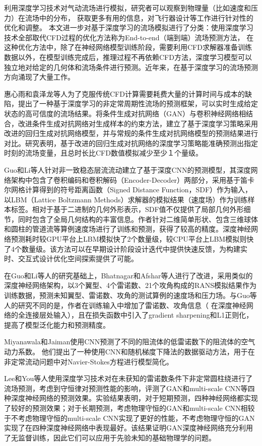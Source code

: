 利用深度学习技术对气动流场进行模拟，研究者可以观察到物理量（比如速度和压力）在流场中的分布，
获取更多有用的信息，对飞行器设计等工作进行针对性的优化和调整。
本文进一步对基于深度学习的流场模拟进行了分类：使用深度学习技术全部取代CFD过程的优化方法称为End-to-end（端到端）流场预测方法，
在这种优化方法中，除了在神经网络模型训练阶段，需要利用CFD求解器准备训练数据以外，在模型训练完成后，推理过程不再依赖CFD方法，深度学习模型可以独立地对给定的几何体和流场条件进行预测。近年来，在基于深度学习的流场预测方向涌现了大量工作。

惠心雨和袁泽龙等人\cite{惠心雨2019}为了克服传统CFD计算需要耗费大量的计算时间与成本的缺陷，提出了一种基于深度学习的非定常周期性流场的预测框架，可以实时生成给定状态的高可信度的流场结果。将条件生成对抗网络（GAN）与卷积神经网络相结合，改进条件生成对抗网络对生成样本的约束方法，建立了基于深度学习策略采用改进的回归生成对抗网络模型，并与常规的条件生成对抗网络模型的预测结果进行对比。研究表明，基于改进的回归生成对抗网络的深度学习策略能准确预测出指定时刻的流场变量，且总时长比CFD数值模拟减少至少１个量级。

Guo和Li等人\cite{DBLP:conf/kdd/GuoLI16}针对非一致稳态层流流动建立了基于深度CNN的预测模型，其深度网络架构中包含了卷积编码和卷积解码（Encoder-Decoder）两部分，采用基于笛卡尔网格计算得到的符号距离函数（Signed Distance Function，SDF）作为输入，以LBM（Lattice Boltzmann Methods）求解器的模拟结果（速度场）作为训练样本标签。相对于基于二进制的几何外形表示，SDF值不仅提供了局部几何外形细节，同时包含了全局几何结构的丰富信息。作者针对二维简单形状、包含三维球体和圆柱的管道流等算例速度场进行了训练和预测，获得了较高的精度。深度神经网络预测耗时较GPU平台上LBM模拟快了2个数量级，较CPU平台上LBM模拟则快了4个数量级。该方法可以在早期设计阶段设计迭代中提供快速反馈，为构建实时、交互式设计优化空间探索提供了可能。

在Guo和Li等人的研究基础上，Bhatnagar和Afshar等人\cite{bhatnagar2019prediction}进行了改进，采用类似的深度神经网络架构，以3个翼型、4个雷诺数、21个攻角构成的RANS模拟结果作为训练数据，预测未知翼型、雷诺数、攻角的测试算例的速度场和压力场。与Guo等人的研究不同的是，作者在训练输入中增加了雷诺数、攻角信息（ 在深度神经网络的全连接层处输入），且在损失函数中引入了gradient sharpening和L1正则化，提高了模型泛化能力和预测精度。

Miyanawala和Jaiman\cite{2017An}使用CNN预测了不同的阻流体的低雷诺数下的阻流体的空气动力系数。 他们提出了一种使用CNN和随机梯度下降法的数据驱动方法，用于在非定常流动问题中对Navier-Stokes方程进行模型简化。

Lee和You等人\cite{lee2019data}使用深度学习技术对在未获知的雷诺数条件下非定常圆柱绕进行了流场预测，考虑到守恒律对预测性能的影响，评测了GAN和multi-scale CNN等四种深度神经网络的预测效果。实验结果表明，对于短期预测，四种神经网络都实现了较好的预测效果；对于长期预测，考虑物理守恒的GAN和multi-scale CNN相较于不考虑物理守恒的multi-scale CNN实现了更好的性能，不考虑物理守恒的GAN实现了在四种深度神经网络中表现最好。该结果证明GAN深度神经网络充分利用了无监督训练，因此它们可以应用于先验未知的基础物理学的问题。

